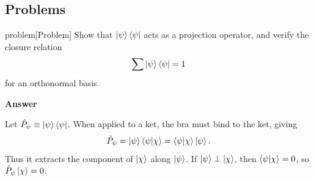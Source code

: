 \documentclass{article}
\begin{document}
\subsection{Problems}
\begin{callout}{problem}[Problem]
\label{problem:s3-p1}
Show that $\ket{\psi }\bra{\psi }$ acts as a projection operator, and verify the closure relation
\[
    \sum \ket{\psi }\bra{\psi }=1
\]
for an orthonormal basis.

\noindent\textbf{Answer}

Let $\hat{P}_{\psi }\equiv \ket{\psi }\bra{\psi }$. When applied to a ket, the bra must bind to the ket, giving
\[
    \hat{P}_\psi =\ket{\psi }\braket{\psi }{\chi }=\braket{\psi }{\chi }\ket{\psi }.
\]
Thus it extracts the component of $\ket{\chi }$ along $\ket{\psi }$. If $\ket{\psi }\perp \ket{\chi }$, then $\braket{\psi }{\chi }=0$, so $\hat{P}_\psi \ket{\chi }=0$.


\end{callout}
\end{document}
